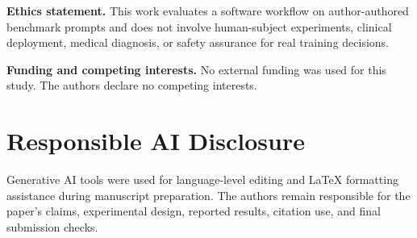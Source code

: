 \documentclass[runningheads,a4paper]{llncs}
\begin{document}
\textbf{Ethics statement.}
This work evaluates a software workflow on author-authored benchmark prompts and does not involve human-subject experiments, clinical deployment, medical diagnosis, or safety assurance for real training decisions.

\textbf{Funding and competing interests.}
No external funding was used for this study. The authors declare no competing interests.

\section*{Responsible AI Disclosure}
Generative AI tools were used for language-level editing and LaTeX formatting assistance during manuscript preparation. The authors remain responsible for the paper's claims, experimental design, reported results, citation use, and final submission checks.




\end{document}
